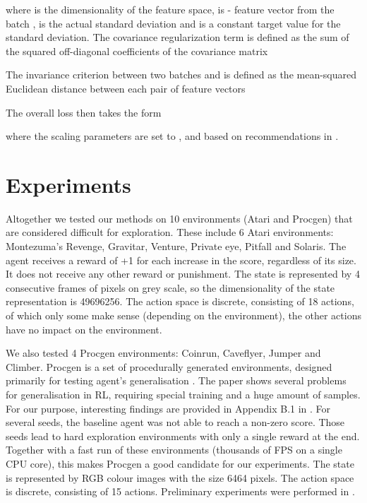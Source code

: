\documentclass[a4paper,11pt]{elsarticle}
\begin{document}
where  is the dimensionality of the feature space,  is - feature vector from the batch ,  is the actual standard deviation and  is a constant target value for the standard deviation. The covariance regularization term  is defined as the sum of the squared off-diagonal coefficients of the covariance matrix 

The invariance criterion  between two batches  and  is defined as the mean-squared Euclidean distance between each pair of feature vectors

The overall loss  then takes the form

where the scaling parameters are set to ,  and  based on recommendations in \cite{Bardes2022}.


\section{Experiments}
\label{sec:exper}

Altogether we tested our methods on 10 environments (Atari and Procgen) that are considered difficult for exploration.
These include 6 Atari environments: Montezuma's Revenge, Gravitar, Venture, Private eye, Pitfall and Solaris. The agent receives a reward of +1 for each increase in the score, regardless of its size. It does not receive any other reward or punishment. The state is represented by 4 consecutive frames of pixels on grey scale, so the dimensionality of the state representation is 49696256. The action space is discrete, consisting of 18 actions, of which only some make sense (depending on the environment), the other actions have no impact on the environment.

We also tested 4 Procgen environments: Coinrun, Caveflyer, Jumper and Climber. Procgen is a set of procedurally generated environments, designed primarily for testing agent's generalisation \citep{cobbe2020procgen}. The paper shows several problems for generalisation in RL, requiring special training and a huge amount of samples. For our purpose, interesting findings are provided in Appendix B.1 in \citep{cobbe2020procgen}. For several seeds, the baseline agent was not able to reach a non-zero score. Those seeds lead to hard exploration environments with only a single reward at the end. Together with a fast run of these environments (thousands of FPS on a single CPU core), this makes Procgen a good candidate for our experiments. The state is represented by RGB colour images with the size 6464 pixels. The action space is discrete, consisting of 15 actions.
Preliminary experiments were performed in \citep{pechac2022intrinsic}.
\end{document}
